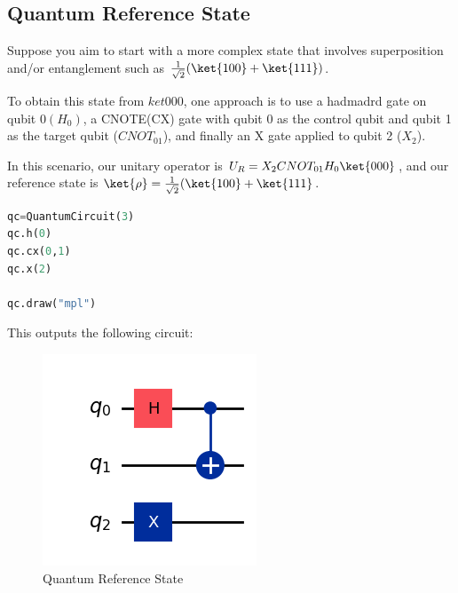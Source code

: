 \documentclass[12pt, oneside]{book}
\theoremstyle{definition}
\theoremstyle{definition}
\theoremstyle{remark}
\begin{document}
\subsection{Quantum Reference State}
Suppose you aim to start with a more complex state that involves superposition and/or entanglement such as $\frac{1}{\sqrt{2}}(\ket{100}+\ket{111})$.

To obtain this state from $ket{000}$, one approach is to use a hadmadrd gate on qubit $0 (H_0)$, a CNOTE(CX) gate with qubit 0 as the control qubit and qubit 1 as the target qubit ($CNOT_{01}$), and finally an X gate applied to qubit 2 ($X_2$).

In this scenario, our unitary operator is $U_R=X_2CNOT_{01}H_0\ket{000}$, and our reference state is $\ket{\rho}=\frac{1}{\sqrt{2}}(\ket{100}+\ket{111}$.
\begin{lstlisting}[language=Python]
qc=QuantumCircuit(3)
qc.h(0)
qc.cx(0,1)
qc.x(2)

qc.draw("mpl")
\end{lstlisting}
This outputs the following circuit:
\begin{figure}[H]
    \centering
    \includegraphics[width=0.5\linewidth]{../images/ref_state_quantum.png}
    \caption{Quantum Reference State}
    \label{fig:ref_state_quantum}
\end{figure}
\end{document}
